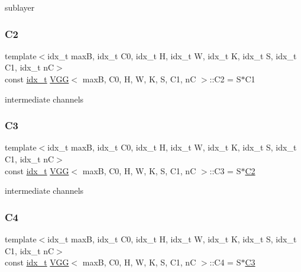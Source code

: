 sublayer \mbox{\label{structVGG_a1e9ad0d15e42696798d44b06ad3c9a9a}} 
\subsubsection{\texorpdfstring{C2}{C2}}
{\footnotesize\ttfamily template$<$idx\+\_\+t maxB, idx\+\_\+t C0, idx\+\_\+t H, idx\+\_\+t W, idx\+\_\+t K, idx\+\_\+t S, idx\+\_\+t C1, idx\+\_\+t nC$>$ \\
const \hyperlink{vgg__util_8h_a8e93478a00e685bea5e6a3f617bf03a3}{idx\+\_\+t} \hyperlink{structVGG}{V\+GG}$<$ maxB, C0, H, W, K, S, C1, nC $>$\+::C2 = S$\ast$C1\hspace{0.3cm}{\ttfamily [static]}}

intermediate channels \mbox{\label{structVGG_a88a35c950ca73035ad75644925c05061}} 
\subsubsection{\texorpdfstring{C3}{C3}}
{\footnotesize\ttfamily template$<$idx\+\_\+t maxB, idx\+\_\+t C0, idx\+\_\+t H, idx\+\_\+t W, idx\+\_\+t K, idx\+\_\+t S, idx\+\_\+t C1, idx\+\_\+t nC$>$ \\
const \hyperlink{vgg__util_8h_a8e93478a00e685bea5e6a3f617bf03a3}{idx\+\_\+t} \hyperlink{structVGG}{V\+GG}$<$ maxB, C0, H, W, K, S, C1, nC $>$\+::C3 = S$\ast$\hyperlink{structVGG_a1e9ad0d15e42696798d44b06ad3c9a9a}{C2}\hspace{0.3cm}{\ttfamily [static]}}

intermediate channels \mbox{\label{structVGG_a4d54a1cc3e99340dfb67e7252719c663}} 
\subsubsection{\texorpdfstring{C4}{C4}}
{\footnotesize\ttfamily template$<$idx\+\_\+t maxB, idx\+\_\+t C0, idx\+\_\+t H, idx\+\_\+t W, idx\+\_\+t K, idx\+\_\+t S, idx\+\_\+t C1, idx\+\_\+t nC$>$ \\
const \hyperlink{vgg__util_8h_a8e93478a00e685bea5e6a3f617bf03a3}{idx\+\_\+t} \hyperlink{structVGG}{V\+GG}$<$ maxB, C0, H, W, K, S, C1, nC $>$\+::C4 = S$\ast$\hyperlink{structVGG_a88a35c950ca73035ad75644925c05061}{C3}\hspace{0.3cm}{\ttfamily [static]}}

